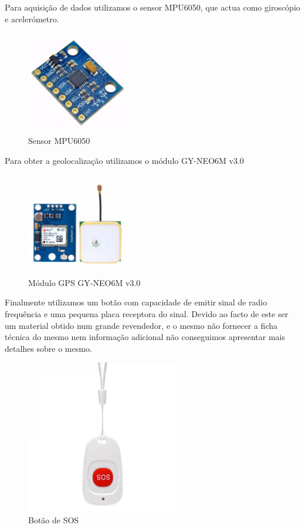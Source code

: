 Para aquisição de dados utilizamos o sensor MPU6050\cite{MPU6050}, que actua como giroscópio e acelerómetro. 

\begin{figure}[!htb]
	\centering
	\includegraphics[width=0.4\textwidth]{figuras/MPU6050.jpg}
	\caption{Sensor MPU6050}
	\label{fig:MPU6050}
\end{figure}

Para obter a geolocalização utilizamos o módulo GY-NEO6M v3.0\cite{NEO6}

\begin{figure}[!htb]
	\centering
	\includegraphics[width=0.4\textwidth]{figuras/NEO6M.jpg}
	\caption{Módulo GPS GY-NEO6M v3.0}
	\label{fig:NEO6M}
\end{figure}

Finalmente utilizamos um botão com capacidade de emitir sinal de radio frequência e uma pequena placa receptora do sinal. Devido ao facto de este ser um material obtido num grande revendedor, e o mesmo não fornecer a ficha técnica do mesmo nem informação adicional não conseguimos apresentar mais detalhes sobre o mesmo.

\begin{figure}[!htb]
	\centering
	\includegraphics[width=0.6\textwidth]{figuras/SOS_Button.jpg}
	\caption{Botão de SOS}
	\label{fig:SOSbutton}
\end{figure}

